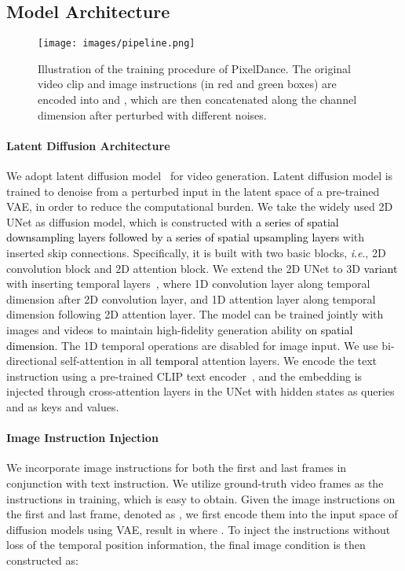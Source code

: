 \documentclass[10pt,twocolumn,letterpaper]{article}
\newcommand{\tcb}{\textcolor{black}}
\newcommand{\ieno}{\textit{i}.\textit{e}.}
\newcommand{\ours}{{PixelDance}}
\begin{document}
\subsection{Model Architecture}
\label{sec: condition vdm}


\begin{figure}[t]
  \centering
  \texttt{[image: images/pipeline.png]}
  \caption{
  Illustration of the training procedure of \ours. The original video clip and image instructions (in red and green boxes) are encoded into  and , which are then concatenated along the channel dimension after perturbed with different noises. 
}
  \label{fig: model}
\end{figure}

\paragraph{Latent Diffusion Architecture} We adopt latent diffusion model~\cite{rombach2022high} for video generation. Latent diffusion model is trained to denoise from a perturbed input in the latent space of a pre-trained VAE, in order to reduce the computational burden. We take the widely used 2D UNet \cite{ronneberger2015u} as diffusion model, which is constructed with \tcb{a series of spatial downsampling layers followed by a series of spatial upsampling layers} with inserted skip connections. Specifically, it is built with two basic blocks, \ieno, 2D convolution block and 2D attention block. We extend the 2D UNet to 3D \tcb{variant} with inserting temporal layers~\cite{VDM}, where 1D convolution layer along temporal dimension after 2D convolution layer, and 1D attention layer along temporal dimension following 2D attention layer. The model can be trained jointly with images and videos to maintain high-fidelity generation ability \tcb{on spatial dimension}. The 1D temporal operations are disabled for image input. We use bi-directional self-attention in all \tcb{temporal} attention layers. We encode the text instruction using a pre-trained CLIP text encoder~\cite{radford2021CLIP}, and the embedding  is injected through cross-attention layers in the UNet with hidden states as queries and  as keys and values.



\paragraph{Image Instruction Injection}
We incorporate image instructions for both the first and last frames in conjunction with text instruction. We utilize ground-truth video frames as the instructions in training, which is easy to obtain. Given the image instructions on the first and last frame, denoted as , we first encode them into the 
input space of diffusion models using VAE, result in  where . To inject the instructions without loss of the temporal position information, the final image condition is then constructed as:
\end{document}
